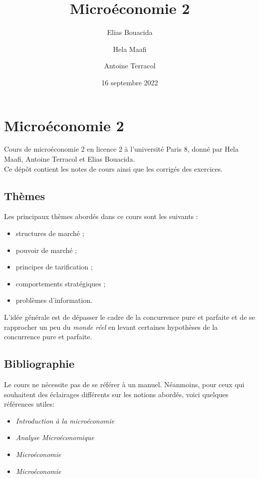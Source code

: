 \documentclass[
]{book}
\title{Microéconomie 2}
\author{Elias Bouacida \and Hela Maafi \and Antoine Terracol}
\date{16 septembre 2022}
\providecommand{\tightlist}{%
  \setlength{\itemsep}{0pt}\setlength{\parskip}{0pt}}
\theoremstyle{definition}
\theoremstyle{definition}
\theoremstyle{definition}
\theoremstyle{definition}
\theoremstyle{remark}
\begin{document}
\maketitle

{
\setcounter{tocdepth}{1}
\tableofcontents
}
\hypertarget{microuxe9conomie-2}{%
\chapter{Microéconomie 2}\label{microuxe9conomie-2}}

Cours de microéconomie 2 en licence 2 à l'université Paris 8, donné par Hela Maafi, Antoine Terracol et Elias Bouacida.\\
Ce dépôt contient les notes de cours ainsi que les corrigés des exercices.

\hypertarget{thuxe8mes}{%
\section{Thèmes}\label{thuxe8mes}}

Les principaux thèmes abordés dans ce cours sont les suivants :

\begin{itemize}
\tightlist
\item
  structures de marché ;
\item
  pouvoir de marché ;
\item
  principes de tarification ;
\item
  comportements stratégiques ;
\item
  problèmes d'information.
\end{itemize}

L'idée générale est de dépasser le cadre de la concurrence pure et parfaite et de se rapprocher un peu du \emph{monde réel} en levant certaines hypothèses de la concurrence pure et parfaite.

\hypertarget{bibliographie}{%
\section{Bibliographie}\label{bibliographie}}

Le cours ne nécessite pas de se référer à un manuel.
Néanmoins, pour ceux qui souhaitent des éclairages différents sur les notions abordés, voici quelques références utiles:

\begin{itemize}
\tightlist
\item
  \citet{varian2015} \emph{Introduction à la microéconomie}
\item
  \citet{varian2008} \emph{Analyse Microéconomique}
\item
  \citet{pindyck2012} \emph{Microéconomie}
\item
  \citet{jeleva2014} \emph{Microéconomie}
\end{itemize}
\end{document}
